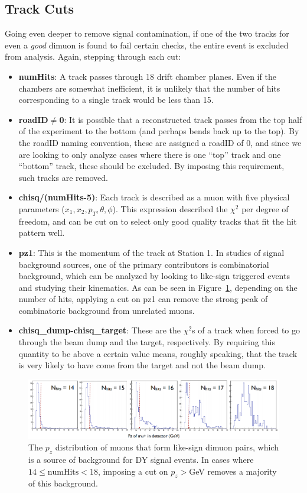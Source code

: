 \subsection{Track Cuts}

Going even deeper to remove signal contamination, if one of the two tracks for even a \emph{good} dimuon is found to fail certain checks, the entire event is excluded from analysis. Again, stepping through each cut:
\begin{itemize}
	\item \textbf{numHits}: A track passes through 18 drift chamber planes. Even if the chambers are somewhat inefficient, it is unlikely that the number of hits corresponding to a single track would be less than 15.
	\item \textbf{roadID$\neq$0}: It is possible that a reconstructed track passes from the top half of the experiment to the bottom (and perhaps bends back up to the top). By the roadID naming convention, these are assigned a roadID of 0, and since we are looking to only analyze cases where there is one ``top'' track and one ``bottom'' track, these should be excluded. By imposing this requirement, such tracks are removed.
	\item \textbf{chisq/(numHits-5)}: Each track is described as a muon with five physical parameters ($x_1, x_2, p_T, \theta, \phi$). This expression described the $\chi^2$ per degree of freedom, and can be cut on to select only good quality tracks that fit the hit pattern well.
	\item \textbf{pz1}: This is the momentum of the track at Station 1. In studies of signal background sources, one of the primary contributors is combinatorial background, which can be analyzed by looking to like-sign triggered events and studying their kinematics. As can be seen in Figure~\ref{fig:likesign-pz-cut}, depending on the number of hits, applying a cut on pz1 can remove the strong peak of combinatoric background from unrelated muons.
	\item \textbf{chisq\_dump-chisq\_target}: These are the $\chi^2$s of a track when forced to go through the beam dump and the target, respectively. By requiring this quantity to be above a certain value means, roughly speaking, that the track is very likely to have come from the target and not the beam dump. 
\end{itemize}

\begin{figure}
	\centering
	\includegraphics[width=\textwidth]{figures/analysis/likesign-pz-cut.png}
	\caption{The $p_z$ distribution of muons that form like-sign dimuon pairs, which is a source of background for DY signal events. In cases where $14\leq\text{numHits}<18$, imposing a cut on $p_z>$\unit[18]{GeV} removes a majority of this background.}
	\label{fig:likesign-pz-cut}
\end{figure}

